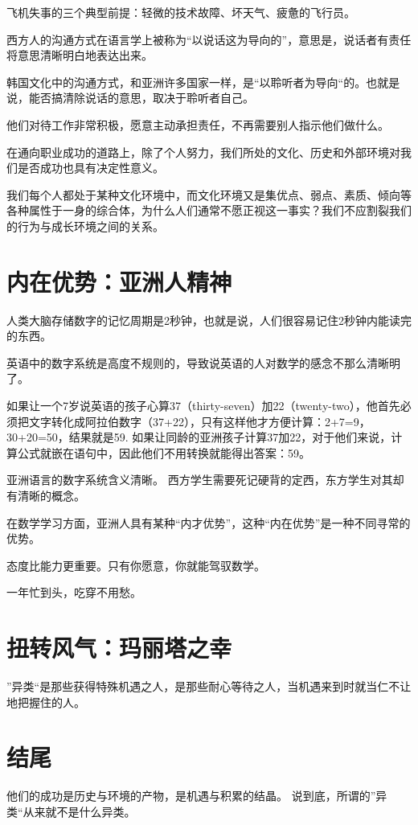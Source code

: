 \documentclass{ctexbook}
\begin{document}
飞机失事的三个典型前提：轻微的技术故障、坏天气、疲惫的飞行员。

西方人的沟通方式在语言学上被称为“以说话这为导向的”，意思是，说话者有责任将意思清晰明白地表达出来。

韩国文化中的沟通方式，和亚洲许多国家一样，是“以聆听者为导向“的。也就是说，能否搞清除说话的意思，取决于聆听者自己。


他们对待工作非常积极，愿意主动承担责任，不再需要别人指示他们做什么。

在通向职业成功的道路上，除了个人努力，我们所处的文化、历史和外部环境对我们是否成功也具有决定性意义。

我们每个人都处于某种文化环境中，而文化环境又是集优点、弱点、素质、倾向等各种属性于一身的综合体，为什么人们通常不愿正视这一事实？我们不应割裂我们的行为与成长环境之间的关系。

\chapter{内在优势：亚洲人精神}

人类大脑存储数字的记忆周期是2秒钟，也就是说，人们很容易记住2秒钟内能读完的东西。

英语中的数字系统是高度不规则的，导致说英语的人对数学的感念不那么清晰明了。


如果让一个7岁说英语的孩子心算37（thirty-seven）加22（twenty-two），他首先必须把文字转化成阿拉伯数字（37+22），只有这样他才方便计算：2+7=9，30+20=50，结果就是59.
如果让同龄的亚洲孩子计算37加22，对于他们来说，计算公式就嵌在语句中，因此他们不用转换就能得出答案：59。

亚洲语言的数字系统含义清晰。
西方学生需要死记硬背的定西，东方学生对其却有清晰的概念。


在数学学习方面，亚洲人具有某种“内才优势”，这种“内在优势”是一种不同寻常的优势。


态度比能力更重要。只有你愿意，你就能驾驭数学。

一年忙到头，吃穿不用愁。


\chapter{扭转风气：玛丽塔之幸}

”异类“是那些获得特殊机遇之人，是那些耐心等待之人，当机遇来到时就当仁不让地把握住的人。


\chapter{结尾}


他们的成功是历史与环境的产物，是机遇与积累的结晶。
说到底，所谓的”异类“从来就不是什么异类。






\backmatter
\listoftables
\listoffigures


\end{document}
